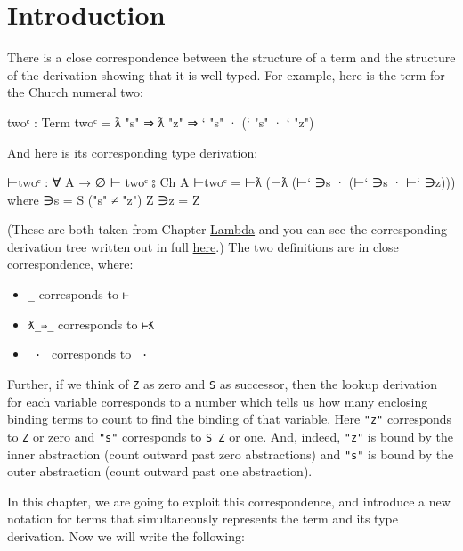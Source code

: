 \hypertarget{introduction}{%
\section{Introduction}\label{introduction}}

There is a close correspondence between the structure of a term and the
structure of the derivation showing that it is well typed. For example,
here is the term for the Church numeral two:

\begin{myDisplay}
twoᶜ : Term
twoᶜ = ƛ "s" ⇒ ƛ "z" ⇒ ` "s" · (` "s" · ` "z")
\end{myDisplay}

And here is its corresponding type derivation:

\begin{myDisplay}
⊢twoᶜ : ∀ {A} → ∅ ⊢ twoᶜ ⦂ Ch A
⊢twoᶜ = ⊢ƛ (⊢ƛ (⊢` ∋s · (⊢` ∋s · ⊢` ∋z)))
  where
  ∋s = S ("s" ≠ "z") Z
  ∋z = Z
\end{myDisplay}

(These are both taken from Chapter \protect\hyperlink{Lambda}{Lambda}
and you can see the corresponding derivation tree written out in full
\protect\hyperlink{Lambda-derivation}{here}.) The two definitions are in
close correspondence, where:

\begin{itemize}
\tightlist
\item
  \texttt{\textasciigrave{}\_} corresponds to
  \texttt{⊢\textasciigrave{}}
\item
  \texttt{ƛ\_⇒\_} corresponds to \texttt{⊢ƛ}
\item
  \texttt{\_·\_} corresponds to \texttt{\_·\_}
\end{itemize}

Further, if we think of \texttt{Z} as zero and \texttt{S} as successor,
then the lookup derivation for each variable corresponds to a number
which tells us how many enclosing binding terms to count to find the
binding of that variable. Here \texttt{"z"} corresponds to \texttt{Z} or
zero and \texttt{"s"} corresponds to \texttt{S\ Z} or one. And, indeed,
\texttt{"z"} is bound by the inner abstraction (count outward past zero
abstractions) and \texttt{"s"} is bound by the outer abstraction (count
outward past one abstraction).

In this chapter, we are going to exploit this correspondence, and
introduce a new notation for terms that simultaneously represents the
term and its type derivation. Now we will write the following:

